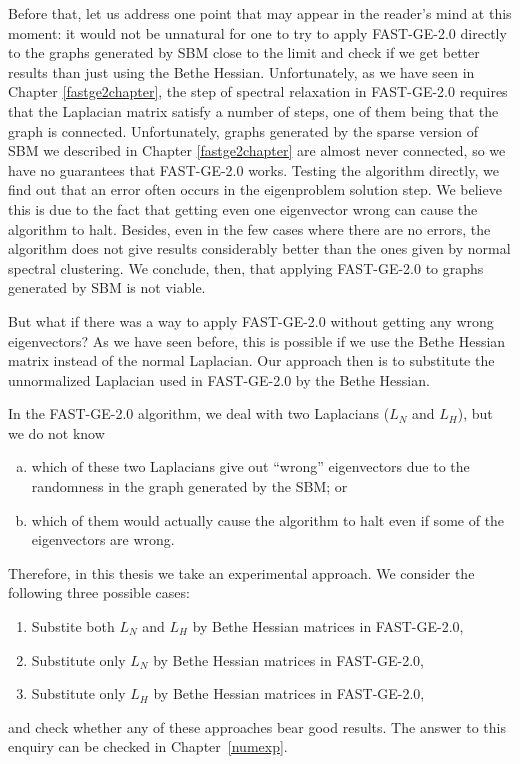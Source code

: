 Before that, let us address one point that may appear in the reader's mind at this moment: it would not be unnatural for one to try to apply FAST-GE-2.0 directly to the graphs generated by SBM close to the limit and check if we get better results than just using the Bethe Hessian.
Unfortunately, as we have seen in Chapter \ref{fastge2chapter}, the step of spectral relaxation in FAST-GE-2.0 requires that the Laplacian matrix satisfy a number of steps, one of them being that the graph is connected. Unfortunately, graphs generated by the sparse version of SBM we described in Chapter \ref{fastge2chapter} are almost never connected, so we have no guarantees that FAST-GE-2.0 works.
Testing the algorithm directly, we find out that an error often occurs in the eigenproblem solution step. We believe this is due to the fact that getting even one eigenvector wrong can cause the algorithm to halt.
Besides, even in the few cases where there are no errors, the algorithm does not give results considerably better than the ones given by normal spectral clustering.
We conclude, then, that applying FAST-GE-2.0 to graphs generated by SBM is not viable.

But what if there was a way to apply FAST-GE-2.0 without getting any wrong eigenvectors?
As we have seen before, this is possible if we use the Bethe Hessian matrix instead of the normal Laplacian.
Our approach then is to substitute the unnormalized Laplacian used in FAST-GE-2.0 by the Bethe Hessian.


In the FAST-GE-2.0 algorithm, we deal with two Laplacians ($L_N$ and $L_H$), but we do not know
\begin{enumerate}[(a)]
   \item which of these two Laplacians give out ``wrong'' eigenvectors due to the randomness in the graph generated by the SBM; or
   \item which of them would actually cause the algorithm to halt even if some of the eigenvectors are wrong.
\end{enumerate}
Therefore, in this thesis we take an experimental approach. We consider the following three possible cases:
\begin{enumerate}[(1)]
   \item Substite both $L_N$ and $L_H$ by Bethe Hessian matrices in FAST-GE-2.0,
   \item Substitute only $L_N$ by Bethe Hessian matrices in FAST-GE-2.0,
   \item Substitute only $L_H$ by Bethe Hessian matrices in FAST-GE-2.0,
\end{enumerate}
and check whether any of these approaches bear good results.
The answer to this enquiry can be checked in Chapter~\ref{numexp}.

